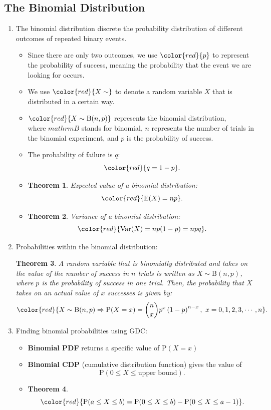 \documentclass[12pt, a4paper]{article}
\newtheorem{theorem}{Theorem}[subsection]
\def\E{{\mathbb{E}}}
\def\P{\mathrm{P}}
\def\Var{\mathrm{Var}}
\def\E{\mathrm{E}}
\begin{document}
\subsection{The Binomial Distribution}
\begin{enumerate}
    \item The binomial distribution discrete the probability distribution of different outcomes of repeated binary events. 
    \begin{itemize}
        \item Since there are only two outcomes, we use ${\color{red}{p}}$ to represent the probability of success, meaning the probability that the event we are looking for occurs. 
        \item We use ${\color{red}{X\sim}}$ to denote a random variable $X$ that is distributed in a certain way. 
        \item ${\color{red}{X\sim \mathrm{B}(n,p)}}$ represents the binomial distribution, \\
        where $mathrm{B}$ stands for binomial, $n$ represents the number of trials in the binomial experiment, and $p$ is the probability of success. 
        \item The probability of failure is $q$: $${\color{red}{q=1-p}}.$$
        \item \begin{theorem}Expected value of a binomial distribution: $${\color{red}{\E(X)=np}}.$$\end{theorem}
        \item \begin{theorem}Variance of a binomial distribution: $${\color{red}{\Var(X)=np(1-p)=npq}}.$$\end{theorem}
    \end{itemize}
    \item Probabilities within the binomial distribution: 
    \begin{theorem} A random variable that is binomially distributed and takes on the value of the number of success in $n$ trials is written as $X\sim\mathrm{B}(n,p)$, where $p$ is the probability of success in one trial. Then, the probability that $X$ takes on an actual value of $x$ successes is given by: 
    $${\color{red}{X\sim\mathrm{B}(n,p)\Rightarrow\P(X=x)=\binom{n}{x}p^x\left(1-p\right)^{n-x},\ x=0,1,2,3,\cdots,n}}.$$
    \end{theorem}
    \item Finding binomial probabilities using GDC: 
    \begin{itemize}
        \item \textbf{Binomial PDF} returns a specific value of $\P(X=x)$
        \item \textbf{Binomial CDP} (cumulative distribution function) gives the value of $$\P(0\leq X\leq \text{upper bound}).$$
        \item \begin{theorem}$${\color{red}{\P(a\leq X\leq b)=\P(0\leq X\leq b)-\P(0\leq X\leq a-1)}}.$$\end{theorem}
    \end{itemize}
\end{enumerate}
\end{document}
